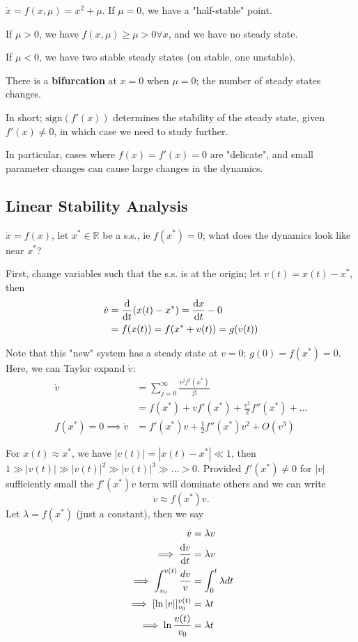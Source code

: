 \documentclass[12pt]{article}
\begin{document}
\begin{example}
  $\dot{x} = f(x, \mu) = x^2 + \mu$. If $\mu = 0$, we have a "half-stable" point. 

  If $\mu > 0$, we have $f(x,\mu) \geq \mu > 0 \forall x$, and we have no steady state.

  If $\mu < 0$, we have two stable steady states (on stable, one unstable).

  There is a \textbf{bifurcation} at $x=0$ when $\mu = 0$; the number of steady states changes.
\end{example}

In short; $\text{sign}(f'(x))$ determines the stability of the steady state, given $f'(x) \neq 0$, in which case we need to study further.

In particular, cases where $f(x)=f'(x)=0$ are "delicate", and small parameter changes can cause large changes in the dynamics.

\subsection{Linear Stability Analysis}

$\dot{x} = f(x)$, let $x^{*} \in \mathbb{R}$ be a s.s., ie $f(x^*) = 0$; what does the dynamics look like near $x^*$?

First, change variables such that the s.s. is at the origin; let $v(t) = x(t) -x^*$, then 
\begin{align*}
  \dot{v} &= \dv{t}(x(t)-x^*)=\dv{x}{t}-0\\
  &= f(x(t)) = f(x^* + v(t)) = g(v(t))
\end{align*}

Note that this "new" system has a steady state at $v=0$; $g(0) = f(x^*) = 0$. Here, we can Taylor expand $\dot{v}$:
\begin{align*}
  \dot{v} &= \sum_{j=0}^\infty \frac{v^j f^{j}(x^*)}{j!}\\
  &= f(x^*) + v f'(x^*) + \frac{v^2}{2} f''(x^*) + \dots\\
  f(x^*) = 0 \implies \dot{v} &= f'(x^*)v+\frac{1}{2}f''(x^*)v^2 + O(v^3)
\end{align*}

For $x(t) \approx x^*$, we have $|v(t)| = |x(t) - x^*| \ll 1$, then $1 \gg |v(t)| \gg |v(t)|^2 \gg |v(t)|^3 \gg \dots > 0$. Provided $f'(x^*)\neq 0$ for $|v|$ sufficiently small the $f'(x^*) v$ term will dominate others and we can write \[\dot{v} \approx f(x^*)v.\]
Let $\lambda = f(x^*)$ (just a constant), then we say 
\begin{align*}
  \dot{v} &= \lambda v\\
  \implies \dv{v}{t} &= \lambda v\\
  \implies \int_{v_0}^{v(t)}\frac{dv}{v} &= \int_0^t \lambda dt\\
  \implies [\ln |v|]_{v_0}^{v(t)} &= \lambda t\\
  \implies \ln \frac{v(t)}{v_0} &= \lambda t
\end{align*}
\end{document}

